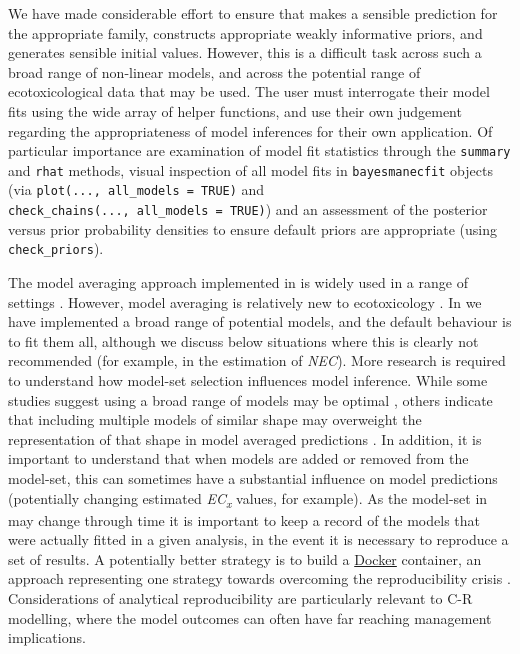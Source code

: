 We have made considerable effort to ensure that  makes a
sensible prediction for the appropriate family, constructs appropriate
weakly informative priors, and generates sensible initial values.
However, this is a difficult task across such a broad range of
non-linear models, and across the potential range of ecotoxicological
data that may be used. The user must interrogate their model fits using
the wide array of helper functions, and use their own judgement
regarding the appropriateness of model inferences for their own
application. Of particular importance are examination of model fit
statistics through the \texttt{summary} and \texttt{rhat} methods,
visual inspection of all model fits in \texttt{bayesmanecfit} objects
(via \texttt{plot(...,\ all\_models\ =\ TRUE)} and
\texttt{check\_chains(...,\ all\_models\ =\ TRUE)}) and an assessment of
the posterior versus prior probability densities to ensure default
priors are appropriate (using \texttt{check\_priors}).

The model averaging approach implemented in  is widely
used in a range of settings \citep[in ecology for example, see][ for a
thorough review]{Dormann2018}. However, model averaging is relatively
new to ecotoxicology \citep[but see, for
example,][]{Shao2014, Thorley2018, fox2020, Wheeler2009}. In
 we have implemented a broad range of potential models,
and the default behaviour is to fit them all, although we discuss below
situations where this is clearly not recommended (for example, in the
estimation of \emph{NEC}). More research is required to understand how
model-set selection influences model inference. While some studies
suggest using a broad range of models may be optimal
\citep{Wheeler2009}, others indicate that including multiple models of
similar shape may overweight the representation of that shape in model
averaged predictions \citep{fox2020}. In addition, it is important to
understand that when models are added or removed from the model-set,
this can sometimes have a substantial influence on model predictions
(potentially changing estimated \emph{EC\textsubscript{x}} values, for
example). As the model-set in  may change through time it
is important to keep a record of the models that were actually fitted in
a given analysis, in the event it is necessary to reproduce a set of
results. A potentially better strategy is to build a
\href{https://docs.docker.com/get-docker/}{Docker} container, an
approach representing one strategy towards overcoming the
reproducibility crisis \citep{Baker2016}. Considerations of analytical
reproducibility are particularly relevant to C-R modelling, where the
model outcomes can often have far reaching management implications.

